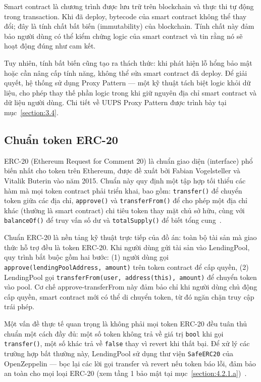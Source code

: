 \documentclass[../DoAn.tex]{subfiles}
\begin{document}
Smart contract là chương trình được lưu trữ trên blockchain và thực thi tự động trong transaction. Khi đã deploy, bytecode của smart contract không thể thay đổi; đây là tính chất bất biến (immutability) của blockchain. Tính chất này đảm bảo người dùng có thể kiểm chứng logic của smart contract và tin rằng nó sẽ hoạt động đúng như cam kết.

Tuy nhiên, tính bất biến cũng tạo ra thách thức: khi phát hiện lỗ hổng bảo mật hoặc cần nâng cấp tính năng, không thể sửa smart contract đã deploy. Để giải quyết, hệ thống sử dụng Proxy Pattern --- một kỹ thuật tách biệt logic khỏi dữ liệu, cho phép thay thế phần logic trong khi giữ nguyên địa chỉ smart contract và dữ liệu người dùng. Chi tiết về UUPS Proxy Pattern được trình bày tại mục~\ref{section:3.4}.

\subsection{Chuẩn token ERC-20}


ERC-20 (Ethereum Request for Comment 20) là chuẩn giao diện (interface) phổ biến nhất cho token trên Ethereum, được đề xuất bởi Fabian Vogelsteller và Vitalik Buterin vào năm 2015. Chuẩn này quy định một tập hợp tối thiểu các hàm mà mọi token contract phải triển khai, bao gồm: \texttt{transfer()} để chuyển token giữa các địa chỉ, \texttt{approve()} và \texttt{transferFrom()} để cho phép một địa chỉ khác (thường là smart contract) chi tiêu token thay mặt chủ sở hữu, cùng với \texttt{balanceOf()} để truy vấn số dư và \texttt{totalSupply()} để biết tổng cung~\cite{EthereumDocs}.

Chuẩn ERC-20 là nền tảng kỹ thuật trực tiếp của đồ án: toàn bộ tài sản mà giao thức hỗ trợ đều là token ERC-20. Khi người dùng gửi tài sản vào LendingPool, quy trình bắt buộc gồm hai bước: (1) người dùng gọi \texttt{approve(lendingPoolAddress, amount)} trên token contract để cấp quyền, (2) LendingPool gọi \texttt{transferFrom(user, address(this), amount)} để chuyển token vào pool. Cơ chế approve-transferFrom này đảm bảo chỉ khi người dùng chủ động cấp quyền, smart contract mới có thể di chuyển token, từ đó ngăn chặn truy cập trái phép.

Một vấn đề thực tế quan trọng là không phải mọi token ERC-20 đều tuân thủ chuẩn một cách đầy đủ: một số token không trả về giá trị \texttt{bool} khi gọi \texttt{transfer()}, một số khác trả về \texttt{false} thay vì revert khi thất bại. Để xử lý các trường hợp bất thường này, LendingPool sử dụng thư viện \texttt{SafeERC20} của OpenZeppelin --- bọc lại các lời gọi transfer và revert nếu token báo lỗi, đảm bảo an toàn cho mọi loại ERC-20 (xem tầng 1 bảo mật tại mục~\ref{section:4.2.1.a})~\cite{OpenZeppelinDocs}.
\end{document}
